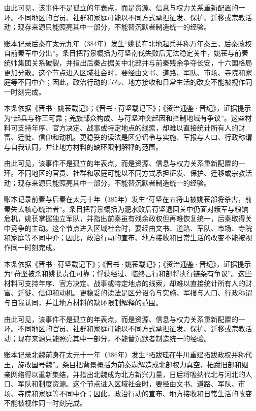 由此可见，该事件不是孤立的年表点，而是资源、信息与权力关系重新配置的一环。不同地区的官员、社群和家庭可能以不同方式承担征发、保护、迁移或宗教活动；现存来源只能照亮其中一部分，不能替沉默者制造统一的经验。

账本记录后秦在太元九年（384年）发生“姚苌在北地起兵并称万年秦王，后秦政权自前秦军中分出”。条目把背景概括为苻坚南伐失败后无法稳定关中，姚苌与前秦统帅集团关系破裂，并指出后秦占据关中北部并与前秦残余争夺长安，十六国格局更加分散。这个节点进入区域社会时，要经由文书、道路、军队、市场、寺院和家庭等不同中介；因此，政治行动的宣布、地方接收和日常生活的改变不能被视作同一时刻完成。

本条依据《晋书·姚苌载记》；《晋书·苻坚载记下》；《资治通鉴·晋纪》，证据提示为“起兵与称王可靠；羌族部众构成、与苻坚冲突起因和控制地域有争议”。这些材料可支持年序、官方决定、战事或特定地点的线索，却难以直接统计所有人的财富、迁徙、信仰和动机。更稳妥的读法是区分诏令与实施、军报与人口、行政称谓与自我认同，并让地方材料的缺环限制解释的范围。

由此可见，该事件不是孤立的年表点，而是资源、信息与权力关系重新配置的一环。不同地区的官员、社群和家庭可能以不同方式承担征发、保护、迁移或宗教活动；现存来源只能照亮其中一部分，不能替沉默者制造统一的经验。

账本记录前秦与后秦在太元十年（385年）发生“苻坚在五将山被姚苌部将杀害，前秦失去核心统治者”。条目把背景概括为淝水败后苻坚退回关中仍面对叛军与粮饷危机，姚苌掌握独立军队，并指出前秦虽有残余政权但再难恢复统一，后秦取得关中竞争的主动。这个节点进入区域社会时，要经由文书、道路、军队、市场、寺院和家庭等不同中介；因此，政治行动的宣布、地方接收和日常生活的改变不能被视作同一时刻完成。

本条依据《晋书·苻坚载记下》；《晋书·姚苌载记》；《资治通鉴·晋纪》，证据提示为“苻坚被杀和姚苌责任可靠；俘获经过、临终言行和部将执行链条有争议”。这些材料可支持年序、官方决定、战事或特定地点的线索，却难以直接统计所有人的财富、迁徙、信仰和动机。更稳妥的读法是区分诏令与实施、军报与人口、行政称谓与自我认同，并让地方材料的缺环限制解释的范围。

由此可见，该事件不是孤立的年表点，而是资源、信息与权力关系重新配置的一环。不同地区的官员、社群和家庭可能以不同方式承担征发、保护、迁移或宗教活动；现存来源只能照亮其中一部分，不能替沉默者制造统一的经验。

账本记录北魏前身在太元十一年（386年）发生“拓跋珪在牛川重建拓跋政权并称代王，旋改国号魏”。条目把背景概括为前秦崩解造成北部权力真空，拓跋旧部和姻亲网络得以重新集结，并指出北魏成为北方新兴力量，日后将吸纳代北与河北的人口、军队和制度资源。这个节点进入区域社会时，要经由文书、道路、军队、市场、寺院和家庭等不同中介；因此，政治行动的宣布、地方接收和日常生活的改变不能被视作同一时刻完成。

